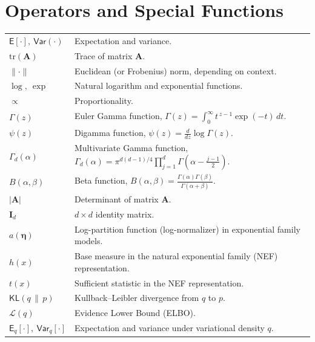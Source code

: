 \section*{Operators and Special Functions}
\begin{tabularx}{\textwidth}{>{\raggedright\arraybackslash}p{3cm} X}
$\mathsf{E}[\cdot],\ \mathsf{Var}(\cdot)$ & Expectation and variance. \\
$\mathrm{tr}(\mathbf{A})$ & Trace of matrix $\mathbf{A}$. \\
$\lVert \cdot \rVert$ & Euclidean (or Frobenius) norm, depending on context. \\
$\log,\ \exp$ & Natural logarithm and exponential functions. \\
$\propto$ & Proportionality. \\
$\Gamma(z)$ & Euler Gamma function, $\displaystyle \Gamma(z) = \int_0^\infty t^{\,z-1}\exp(-t)\,dt$. \\
$\psi(z)$ & Digamma function, $\displaystyle \psi(z) = \frac{d}{dz}\log \Gamma(z)$. \\
$\Gamma_d(\alpha)$ & Multivariate Gamma function, $\displaystyle \Gamma_d(\alpha) = \pi^{d(d-1)/4}\prod_{j=1}^{d}\Gamma\!\left(\alpha-\tfrac{j-1}{2}\right)$. \\
$B(\alpha,\beta)$ & Beta function, $\displaystyle B(\alpha,\beta)=\frac{\Gamma(\alpha)\Gamma(\beta)}{\Gamma(\alpha+\beta)}$. \\
$|\mathbf{A}|$ & Determinant of matrix $\mathbf{A}$. \\
$\mathbf{I}_d$ & $d\times d$ identity matrix. \\
$a(\bm{\eta})$ & Log-partition function (log-normalizer) in exponential family models. \\
$h(x)$ & Base measure in the natural exponential family (NEF) representation. \\
$t(x)$ & Sufficient statistic in the NEF representation. \\
$\mathsf{KL}(q\,\|\,p)$ & Kullback--Leibler divergence from $q$ to $p$. \\
$\mathcal{L}(q)$ & Evidence Lower Bound (ELBO). \\
$\mathsf{E}_q[\cdot],\ \mathsf{Var}_q[\cdot]$ & Expectation and variance under variational density $q$. \\
\end{tabularx}

